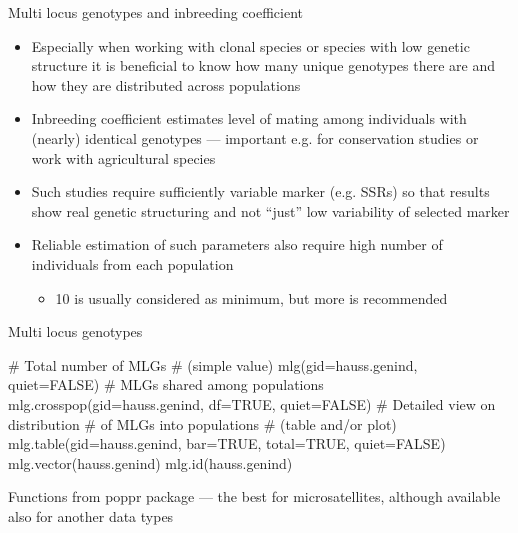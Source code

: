 \documentclass[compress, xelatex, 11pt, xcolor=svgnames, aspectratio=169,
	hyperref={
		bookmarks=true,
		unicode=true,
		colorlinks=true,
		pdftitle={Molecular data in R},
		plainpages=false,
		pdfauthor={Vojtech Zeisek},
		pdfsubject={Course about phylogeny and evolution in R},
		pdfcreator={XeLaTeX},
		pdfkeywords={R, evolution, phylogeny, molecular data},
		linkcolor=Crimson, %
		anchorcolor=Magenta, %
		citecolor=Magenta, %
		filecolor=Magenta, %
		menucolor=Magenta, %
		urlcolor=DodgerBlue, %
		},
	url={hyphens, lowtilde} %
	]{beamer}
\renewcommand{\texttt}[1]{\colorbox{Beige}{{\ttfamily #1}}}
\begin{document}
\begin{frame}{Multi locus genotypes and inbreeding coefficient}
	\begin{itemize}
		\item Especially when working with clonal species or species with low genetic structure it is beneficial to know how many unique genotypes there are and how they are distributed across populations
		\item Inbreeding coefficient estimates level of mating among individuals with (nearly) identical genotypes --- important e.g. for conservation studies or work with agricultural species
		\item Such studies require sufficiently variable marker (e.g. SSRs) so that results show real genetic structuring and not \enquote{just} low variability of selected marker
		\item Reliable estimation of such parameters also require high number of individuals from each population
		\begin{itemize}
			\item 10 is usually considered as minimum, but more is recommended
		\end{itemize}
	\end{itemize}
\end{frame}

\begin{frame}[fragile]{Multi locus genotypes}
	\begin{multicols}{2}
		\texttt{[image: mlg.png]}
		\begin{spluscode}
    # Total number of MLGs
    # (simple value)
    mlg(gid=hauss.genind, quiet=FALSE)
    # MLGs shared among populations
    mlg.crosspop(gid=hauss.genind,
      df=TRUE, quiet=FALSE)
    # Detailed view on distribution
    # of MLGs into populations
    # (table and/or plot)
    mlg.table(gid=hauss.genind,
      bar=TRUE, total=TRUE,
      quiet=FALSE)
    mlg.vector(hauss.genind)
    mlg.id(hauss.genind)
		\end{spluscode}
	\end{multicols}
	Functions from poppr package --- the best for microsatellites, although available also for another data types
\end{frame}
\end{document}
